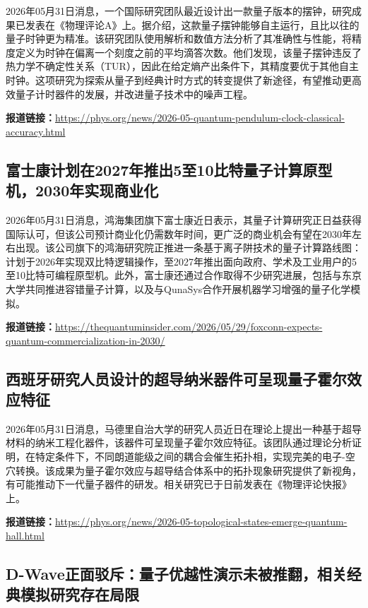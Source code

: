 \documentclass[12pt,a4paper]{ctexart}
\begin{document}
2026年05月31日消息，一个国际研究团队最近设计出一款量子版本的摆钟，研究成果已发表在《物理评论A》上。据介绍，这款量子摆钟能够自主运行，且比以往的量子时钟更为精准。该研究团队使用解析和数值方法分析了其准确性与性能，将精度定义为时钟在偏离一个刻度之前的平均滴答次数。他们发现，该量子摆钟违反了热力学不确定性关系（TUR），因此在给定熵产出条件下，其精度要优于其他自主时钟。这项研究为探索从量子到经典计时方式的转变提供了新途径，有望推动更高效量子计时器件的发展，并改进量子技术中的噪声工程。

\noindent\textbf{报道链接：}\url{https://phys.org/news/2026-05-quantum-pendulum-clock-classical-accuracy.html}

\subsection{ 富士康计划在2027年推出5至10比特量子计算原型机，2030年实现商业化 }

2026年05月31日消息，鸿海集团旗下富士康近日表示，其量子计算研究正日益获得国际认可，但该公司预计商业化仍需数年时间，更广泛的商业机会有望在2030年左右出现。该公司旗下的鸿海研究院正推进一条基于离子阱技术的量子计算路线图：计划于2026年实现双比特逻辑操作，至2027年推出面向政府、学术及工业用户的5至10比特可编程原型机。此外，富士康还通过合作取得不少研究进展，包括与东京大学共同推进容错量子计算，以及与QunaSys合作开展机器学习增强的量子化学模拟。

\noindent\textbf{报道链接：}\url{https://thequantuminsider.com/2026/05/29/foxconn-expects-quantum-commercialization-in-2030/}

\subsection{ 西班牙研究人员设计的超导纳米器件可呈现量子霍尔效应特征 }

2026年05月31日消息，马德里自治大学的研究人员近日在理论上提出一种基于超导材料的纳米工程化器件，该器件可呈现量子霍尔效应特征。该团队通过理论分析证明，在特定条件下，不同朗道能级之间的耦合会催生拓扑相，实现完美的电子-空穴转换。该成果为量子霍尔效应与超导结合体系中的拓扑现象研究提供了新视角，有可能推动下一代量子器件的研发。相关研究已于日前发表在《物理评论快报》上。

\noindent\textbf{报道链接：}\url{https://phys.org/news/2026-05-topological-states-emerge-quantum-hall.html}

\subsection{ D-Wave正面驳斥：量子优越性演示未被推翻，相关经典模拟研究存在局限 }
\end{document}
